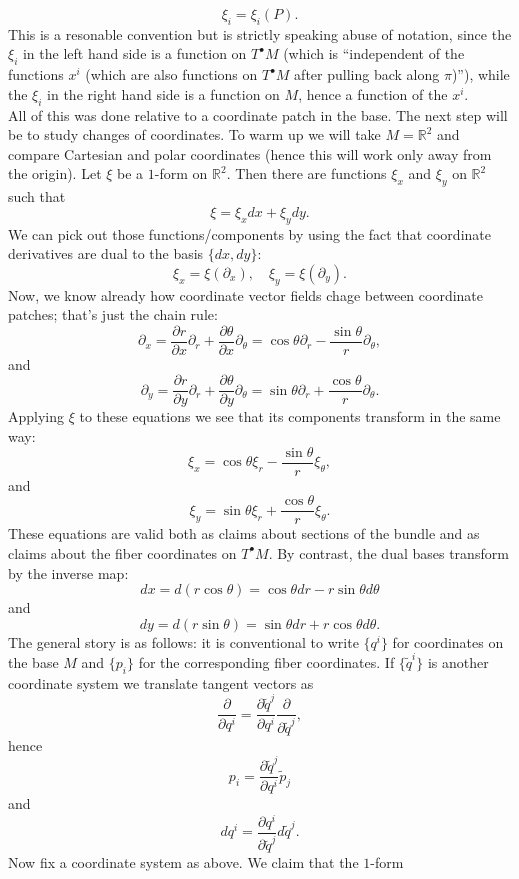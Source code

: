 \documentclass[11pt]{article} %
\begin{document}
$$
\xi_i = \xi_i(P).
$$
This is a resonable convention but is strictly speaking abuse of notation, since the $\xi_i$ in the left hand side is a function on $T^\bullet M$ (which is ``independent of the functions $x^i$ (which are also functions on $T^\bullet M$ after pulling back along $\pi$)''), while the $\xi_i$ in the right hand side is a function on $M$, hence a function of the $x^i$.\\
All of this was done relative to a coordinate patch in the base. The next step will be to study changes of coordinates. To warm up we will take $M = \mathbb{R}^2$ and compare Cartesian and polar coordinates (hence this will work only away from the origin). Let $\xi$ be a $1$-form on $\mathbb{R}^2$. Then there are functions $\xi_x$ and $\xi_y$ on $\mathbb{R}^2$ such that
$$
\xi = \xi_x dx + \xi_y dy.
$$
We can pick out those functions/components by using the fact that coordinate derivatives are dual to the basis $\{dx, dy\}$:
$$
\xi_x = \xi(\partial_x),\quad \xi_y = \xi(\partial_y).
$$
Now, we know already how coordinate vector fields chage between coordinate patches; that's just the chain rule:
$$
\partial_x = \frac{\partial r}{\partial x}\partial_r + \frac{\partial \theta}{\partial x} \partial_\theta = \cos\theta \partial_r - \frac{\sin\theta}{r} \partial_\theta,
$$
and
$$
\partial_y = \frac{\partial r}{\partial y}\partial_r + \frac{\partial \theta}{\partial y} \partial_\theta =\sin\theta \partial_r + \frac{\cos\theta}{r} \partial_\theta.
$$
Applying $\xi$ to these equations we see that its components transform in the same way:
$$
\xi_x = \cos\theta \xi_r - \frac{\sin\theta}{r} \xi_\theta,
$$
and
$$
\xi_y = \sin\theta \xi_r + \frac{\cos\theta}{r} \xi_\theta.
$$
These equations are valid both as claims about sections of the bundle and as claims about the fiber coordinates on $T^\bullet M$. By contrast, the dual bases transform by the inverse map:
$$
dx = d(r \cos\theta) = \cos\theta dr  - r \sin\theta d\theta
$$
and
$$
dy = d(r \sin\theta) = \sin\theta dr + r \cos\theta d\theta.
$$
The general story is as follows: it is conventional to write $\{q^i\}$ for coordinates on the base $M$ and $\{p_i\}$ for the corresponding fiber coordinates. If  $\{\tilde{q}^i\}$ is another coordinate system we translate tangent vectors as 
$$
\frac{\partial }{\partial q^i} = \frac{\partial \tilde{q}^j}{\partial q^i}\frac{\partial }{\partial \tilde{q}^j},
$$
hence
$$
p_i = \frac{\partial \tilde{q}^j}{\partial q^i} \tilde{p}_j
$$
and
$$
dq^i = \frac{\partial q^i}{\partial \tilde{q}^j} d\tilde{q}^j.
$$
Now fix a coordinate system as above. We claim that the $1$-form 
\end{document}
